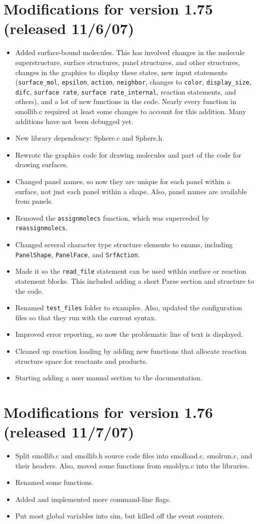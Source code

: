 \documentclass {scrbook}
\newcommand {\ttt} {\texttt}
\begin{document}
\section{Modifications for version 1.75 (released 11/6/07)}
\begin{itemize}
\item Added surface-bound molecules. This has involved changes in the molecule superstructure, surface structures, panel structures, and other structures, changes in the graphics to display these states, new input statements (\ttt{surface\_mol}, \ttt{epsilon}, \ttt{action}, \ttt{neighbor}, changes to \ttt{color}, \ttt{display\_size}, \ttt{difc}, \ttt{surface rate}, \ttt{surface rate\_internal}, reaction statements, and others), and a lot of new functions in the code. Nearly every function in smollib.c required at least some changes to account for this addition. Many additions have not been debugged yet.
\item New library dependency: Sphere.c and Sphere.h.
\item Rewrote the graphics code for drawing molecules and part of the code for drawing surfaces.
\item Changed panel names, so now they are unique for each panel within a surface, not just each panel within a shape. Also, panel names are available from panels.
\item Removed the \ttt{assignmolecs} function, which was superceded by \ttt{reassignmolecs}.
\item Changed several character type structure elements to enums, including \ttt{PanelShape}, \ttt{PanelFace}, and \ttt{SrfAction}.
\item Made it so the \ttt{read\_file} statement can be used within surface or reaction statement blocks. This included adding a short Parse section and structure to the code.
\item Renamed \ttt{test\_files} folder to examples. Also, updated the configuration files so that they run with the current syntax.
\item Improved error reporting, so now the problematic line of text is displayed.
\item Cleaned up reaction loading by adding new functions that allocate reaction structure space for reactants and products.
\item Starting adding a user manual section to the documentation.
\end{itemize}

\section{Modifications for version 1.76 (released 11/7/07)}
\begin{itemize}
\item Split smollib.c and smollib.h source code files into smolload.c, smolrun.c, and their headers. Also, moved some functions from smoldyn.c into the libraries.
\item Renamed some functions.
\item Added and implemented more command-line flags.
\item Put most global variables into sim, but killed off the event counters.
\end{itemize}
\end{document}
